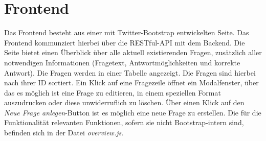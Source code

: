 \section{Frontend}
Das Frontend besteht aus einer mit Twitter-Bootstrap entwickelten Seite. Das Frontend kommunziert hierbei über die RESTful-API mit dem Backend. Die Seite bietet einen Überblick über alle aktuell existierenden Fragen, zusätzlich aller notwendigen Informationen (Fragetext, Antwortmöglichkeiten und korrekte Antwort).
Die Fragen werden in einer Tabelle angezeigt. Die Fragen sind hierbei nach ihrer ID sortiert. Ein Klick auf eine Fragezeile öffnet ein Modalfenster, über das es möglich ist eine Frage zu editieren, in einem speziellen Format auszudrucken oder diese unwiderruflich zu löschen. Über einen Klick auf den \emph{Neue Frage anlegen}-Button ist es möglich eine neue Frage zu erstellen.
Die für die Funktionalität relevanten Funktionen, sofern sie nicht Bootstrap-intern sind, befinden sich in der Datei \emph{overview.js}.